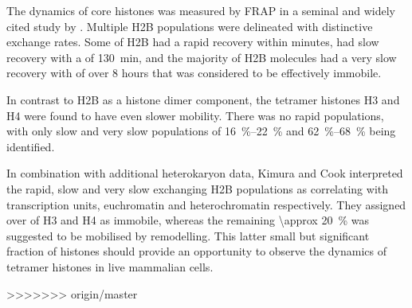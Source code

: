 
    The dynamics of core histones was measured by FRAP in a seminal
    and widely cited study by \citep{KimuraCook}.  Multiple H2B
    populations were delineated with distinctive exchange rates.  Some
     of H2B had a rapid recovery within minutes, 
    had slow recovery with a \halflife[] of \SI{130}{\minute}, and the
    majority of H2B molecules had a very slow recovery with \halflife[] of
    over 8 hours that was considered to be effectively immobile.

    In contrast to H2B as a histone dimer component, the tetramer
    histones H3 and H4 were found to have even slower mobility.  There
    was no rapid populations, with only slow and very slow populations
    of \SIrange{16}{22}{\percent} and \SIrange{62}{68}{\percent} being
    identified.

    In combination with additional heterokaryon data, Kimura and Cook
    interpreted the rapid, slow and very slow exchanging H2B
    populations as correlating with transcription units, euchromatin
    and heterochromatin respectively.  They assigned over 
    of H3 and H4 as immobile, whereas the remaining
    \SI{\approx 20}{\percent} was suggested to be mobilised by
    remodelling.  This latter small but significant fraction of
    histones should provide an opportunity to observe the dynamics of
    tetramer histones in live mammalian cells.

>>>>>>> origin/master

